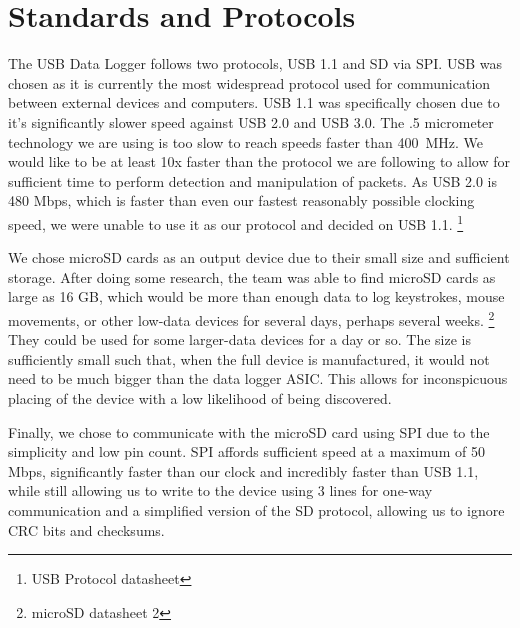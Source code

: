 \documentclass[12pt,letter,oneside]{report}
\begin{document}
\section{Standards and Protocols}
The USB Data Logger follows two protocols, USB 1.1 and SD via SPI. USB was chosen as it is currently the most widespread protocol used for communication between external devices and computers. USB 1.1 was specifically chosen due to it's significantly slower speed against USB 2.0 and USB 3.0. The .5 micrometer technology we are using is too slow to reach speeds faster than \SI{400}{\mega\hertz}. We would like to be at least 10x faster than the protocol we are following to allow for sufficient time to perform detection and manipulation of packets. As USB 2.0 is 480 Mbps, which is faster than even our fastest reasonably possible clocking speed, we were unable to use it as our protocol and decided on USB 1.1. \footnote{USB Protocol datasheet}

We chose microSD cards as an output device due to their small size and sufficient storage. After doing some research, the team was able to find microSD cards as large as 16 GB, which would be more than enough data to log keystrokes, mouse movements, or other low-data devices for several days, perhaps several weeks. \footnote{microSD datasheet 2} They could be used for some larger-data devices for a day or so. The size is sufficiently small such that, when the full device is manufactured, it would not need to be much bigger than the data logger ASIC. This allows for inconspicuous placing of the device with a low likelihood of being discovered.

Finally, we chose to communicate with the microSD card using SPI due to the simplicity and low pin count. SPI affords sufficient speed at a maximum of 50 Mbps, significantly faster than our clock and incredibly faster than USB 1.1, while still allowing us to write to the device using 3 lines for one-way communication and a simplified version of the SD protocol, allowing us to ignore CRC bits and checksums.
\end{document}
